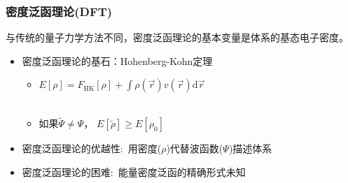 \frame                               %
{
\frametitle{密度泛函理论(\textrm{DFT})} %
与传统的量子力学方法不同，密度泛函理论的基本变量是体系的基态电子密度。%
\begin{itemize}%
	\item 密度泛函理论的基石：\textrm{Hohenberg-Kohn}定理
\vskip 5pt
\begin{itemize}%
   \setlength{\itemsep}{8pt}
 \item $E[\rho]=F_{\mathrm{HK}}[\rho]+\displaystyle\int\rho(\vec{r})v(\vec{r})\textrm{d}\vec{r}$ \\
\vskip 5pt 
{\fontsize{7.2pt}{6.2pt}}\\%
\textcolor{magenta}{\fontsize{8.2pt}{6.2pt}\selectfont{第一定理表明多电子体系的性质完全由体系的基态密度决定}}
   \item 如果$\tilde\Psi\neq\Psi$，
     $E[\tilde\rho]\geqslant E[\rho_0]$\\
     \textcolor{magenta}{\fontsize{8.2pt}{6.2pt}\selectfont{第二定理指出基态总能量泛函在体系基态电子密度处取极小值}}
   \end{itemize}
\vskip 8pt
 \item 密度泛函理论的优越性:~用密度($\rho$)代替波函数($\Psi$)描述体系
\vskip 5pt
 \item 密度泛函理论的困难:~能量密度泛函的精确形式未知
   \end{itemize}
}

